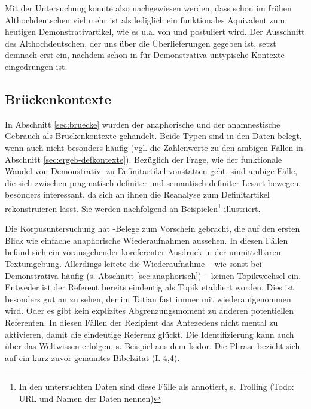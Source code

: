 Mit der Untersuchung konnte also nachgewiesen werden, dass  schon im frühen Althochdeutschen viel mehr ist als lediglich ein funktionales Aquivalent zum heutigen Demonstrativartikel, wie es u.a. von \textcite{Philippi1997} und \textcite{Demske2001} postuliert wird. Der Ausschnitt des Althochdeutschen, der uns über die Überlieferungen gegeben ist, setzt demnach erst ein, nachdem  schon in für Demonstrativa untypische Kontexte eingedrungen ist. 


\subsection{Brückenkontexte}\label{sec:disk-bruecken}

In Abschnitt \ref{sec:bruecke} wurden der anaphorische und der anamnestische Gebrauch als Brückenkontexte gehandelt. Beide Typen sind in den Daten belegt, wenn auch nicht besonders häufig (vgl. die Zahlenwerte zu den ambigen Fällen in Abschnitt \ref{sec:ergeb-defkontexte}). Bezüglich der Frage, wie der funktionale Wandel von Demonstrativ- zu Definitartikel vonstatten geht, sind ambige Fälle, die sich zwischen pragmatisch-definiter und semantisch-definiter Lesart bewegen, besonders interessant, da sich an ihnen die Reanalyse zum Definitartikel rekonstruieren lässt. Sie werden nachfolgend an Beispielen\footnote{In den untersuchten Daten sind diese Fälle als  annotiert, s. Trolling (Todo: URL und Namen der Daten nennen)} illustriert. 

 

Die Korpusuntersuchung hat -Belege zum Vorschein gebracht, die auf den ersten Blick wie einfache anaphorische Wiederaufnahmen aussehen. In diesen Fällen befand sich ein vorausgehender koreferenter Ausdruck in der unmittelbaren Textumgebung. Allerdings leitete die Wiederaufnahme -- wie sonst bei Demonstrativa häufig (s. Abschnitt \ref{sec:anaphorisch}) -- keinen Topikwechsel ein. Entweder ist der Referent bereits eindeutig als Topik etabliert worden. Dies ist besonders gut an  zu sehen, der im Tatian fast immer mit  wiederaufgenommen wird. Oder es gibt kein explizites Abgrenzungsmoment zu anderen potentiellen Referenten.
In diesen Fällen  der Rezipient das Antezedens nicht mental zu aktivieren, damit die eindeutige Referenz glückt. Die Identifizierung kann auch über das Weltwissen erfolgen, s. Beispiel  aus dem Isidor. Die Phrase    bezieht sich auf ein kurz zuvor genanntes Bibelzitat  (I. 4,4).

